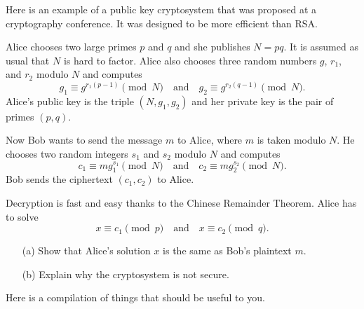 \documentclass{article}
\begin{document}
    \begin{exercise}
        Here is an example of a public key cryptosystem that was proposed at a cryptography conference.
        It was designed to be more efficient than RSA.

        Alice chooses two large primes \(p\) and \(q\) and she publishes \(N=pq\).
        It is assumed as usual that \(N\) is hard to factor.
        Alice also chooses three random numbers \(g\), \(r_1\), and \(r_2\) modulo \(N\) and computes 
        \[g_1 \equiv g^{r_1(p-1)}\pmod{N}\quad\textrm{and}\quad g_2 \equiv g^{r_2(q-1)}\pmod{N}.\]
        Alice's public key is the triple \((N,g_1,g_2)\) and her private key is the pair of primes \((p,q)\).

        Now Bob wants to send the message \(m\) to Alice, where \(m\) is taken modulo \(N\).
        He chooses two random integers \(s_1\) and \(s_2\) modulo \(N\) and computes
        \[c_1 \equiv mg_1^{s_1}\pmod{N}\quad\textrm{and}\quad c_2 \equiv mg_2^{s_2}\pmod{N}.\]
        Bob sends the ciphertext \((c_1,c_2)\) to Alice.

        Decryption is fast and easy thanks to the Chinese Remainder Theorem.
        Alice has to solve
        \[x\equiv c_1\pmod{p}\quad\textrm{and}\quad x\equiv c_2\pmod{q}.\]

        \begin{enumerate}
            \item[(a)] Show that Alice's solution \(x\) is the same as Bob's plaintext \(m\).
            \item[(b)] Explain why the cryptosystem is not secure. 
        \end{enumerate}
    \end{exercise}
    \iffalse
    Solution:
    \begin{enumerate}
        \item[(a)] Apply Fermat's little theorem to \(c_1\equiv mg_1^{s_1}\equiv mg^{r_1s_1(p-1)}\equiv m\pmod{p}\).
        \item[(b)] By FLT, we have that \(g_1\equiv g^{r_1(p-1)}\equiv 1\pmod{p}\).
        If \(g_1\not\equiv 1\pmod{q}\), Eve computes \(\gcd(g_1-1,N)=p\) easily.
        If \(g_1\equiv 1\pmod{q}\), then \(c_1\equiv m\pmod{N}\), so she can read the message.
        Either way, Eve can recover the message.
    \end{enumerate}
    \fi

\newpage 

Here is a compilation of things that should be useful to you.
\end{document}
